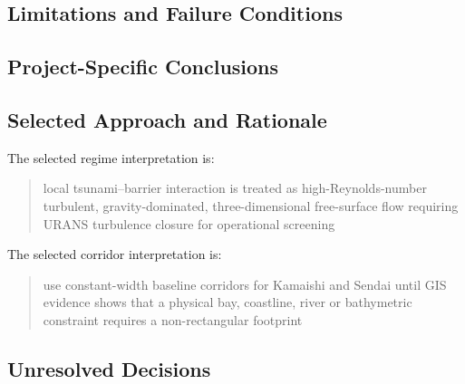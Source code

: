 
\subsection{Limitations and Failure Conditions}
\label{sec:res-phy-scl-limitations}


\subsection{Project-Specific Conclusions}
\label{sec:res-phy-scl-conclusions}


\subsection{Selected Approach and Rationale}
\label{sec:res-phy-scl-selected-approach}


The selected regime interpretation is:

\begin{quote}
  local tsunami--barrier interaction is treated as high-Reynolds-number
  turbulent, gravity-dominated, three-dimensional free-surface flow
  requiring URANS turbulence closure for operational screening
\end{quote}

The selected corridor interpretation is:

\begin{quote}
  use constant-width baseline corridors for Kamaishi and Sendai until
  GIS evidence shows that a physical bay, coastline, river or
  bathymetric constraint requires a non-rectangular footprint
\end{quote}

\subsection{Unresolved Decisions}
\label{sec:res-phy-scl-unresolved-decisions}


